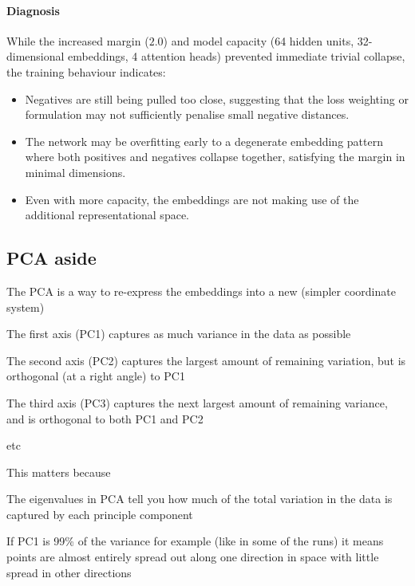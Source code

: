\paragraph{Diagnosis}
While the increased margin ($2.0$) and model capacity (64 hidden units, 32-dimensional embeddings, 4 attention heads) prevented immediate trivial collapse, the training behaviour indicates:
\begin{itemize}
    \item Negatives are still being pulled too close, suggesting that the loss weighting or formulation may not sufficiently penalise small negative distances.
    \item The network may be overfitting early to a degenerate embedding pattern where both positives and negatives collapse together, satisfying the margin in minimal dimensions.
    \item Even with more capacity, the embeddings are not making use of the additional representational space.
\end{itemize}

\subsection{PCA aside}

The PCA is a way to re-express the embeddings into a new (simpler coordinate system)

\begin{compactitem}
\item The first axis (PC1) captures as much variance in the data as possible 
\item The second axis (PC2) captures the largest amount of remaining variation, but is orthogonal (at a right angle) to PC1
\item The third axis (PC3) captures the next largest amount of remaining variance, and is orthogonal to both PC1 and PC2
\item etc
\end{compactitem}

This matters because
\begin{compactitem}
\item The eigenvalues in PCA tell you how much of the total variation in the data is captured by each principle component
\item If PC1 is 99\% of the variance for example (like in some of the runs) it means points are almost entirely spread out along one direction in space with little spread in other directions
\end{compactitem}

